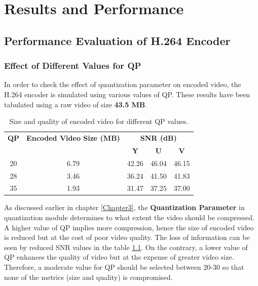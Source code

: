 
\chapter{Results and Performance} %
\label{Chapter5}



\section{Performance Evaluation of H.264 Encoder}

\subsection{Effect of Different Values for QP}
In order to check the effect of quantization parameter on encoded video, the H.264 encoder is simulated using various values of QP. These results have been tabulated using a raw video of size \textbf{43.5 MB}.
\begin{table}[H]
	\centering
	\begin{tabular}{|c|c|c|c|c|} \hline
		\textbf{QP}  & \textbf{Encoded Video Size (MB)} & \multicolumn{3}{|c|}{\textbf{SNR (dB)}}  \\
		\cline{3-5}
		&                    &  \textbf{Y} & \textbf{U} & \textbf{V}\\ \hline
		20  &    6.79            & 42.26   & 46.04  & 46.15  \\ \hline
		28  &    3.46            & 36.24   & 41.50  & 41.83  \\ \hline
		35  &    1.93            & 31.47   & 37.25  & 37.00  \\ \hline
	\end{tabular}
	\caption{Size and quality of encoded video for different QP values.}
	\label{tab:qp}
\end{table}
As discussed earlier in chapter \ref{Chapter3}, the \textbf{Quantization Parameter} in quantization module determines to what extent the video should be compressed. A higher value of QP implies more compression, hence the size of encoded video is reduced but at the cost of poor video quality. The loss of information can be seen by reduced SNR values in the table \ref{tab:qp}. On the contrary, a lower value of QP enhances the quality of video but at the expense of greater video size. Therefore, a moderate value for QP should be selected between 20-30 so that none of the metrics (size and quality) is compromised. 


